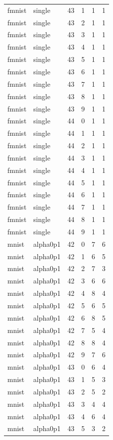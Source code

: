 \begin{tabular}{llrrrr}
fmnist & single & 43 & 1 & 1 & 1 \\
fmnist & single & 43 & 2 & 1 & 1 \\
fmnist & single & 43 & 3 & 1 & 1 \\
fmnist & single & 43 & 4 & 1 & 1 \\
fmnist & single & 43 & 5 & 1 & 1 \\
fmnist & single & 43 & 6 & 1 & 1 \\
fmnist & single & 43 & 7 & 1 & 1 \\
fmnist & single & 43 & 8 & 1 & 1 \\
fmnist & single & 43 & 9 & 1 & 1 \\
fmnist & single & 44 & 0 & 1 & 1 \\
fmnist & single & 44 & 1 & 1 & 1 \\
fmnist & single & 44 & 2 & 1 & 1 \\
fmnist & single & 44 & 3 & 1 & 1 \\
fmnist & single & 44 & 4 & 1 & 1 \\
fmnist & single & 44 & 5 & 1 & 1 \\
fmnist & single & 44 & 6 & 1 & 1 \\
fmnist & single & 44 & 7 & 1 & 1 \\
fmnist & single & 44 & 8 & 1 & 1 \\
fmnist & single & 44 & 9 & 1 & 1 \\
mnist & alpha0p1 & 42 & 0 & 7 & 6 \\
mnist & alpha0p1 & 42 & 1 & 6 & 5 \\
mnist & alpha0p1 & 42 & 2 & 7 & 3 \\
mnist & alpha0p1 & 42 & 3 & 6 & 6 \\
mnist & alpha0p1 & 42 & 4 & 8 & 4 \\
mnist & alpha0p1 & 42 & 5 & 6 & 5 \\
mnist & alpha0p1 & 42 & 6 & 8 & 5 \\
mnist & alpha0p1 & 42 & 7 & 5 & 4 \\
mnist & alpha0p1 & 42 & 8 & 8 & 4 \\
mnist & alpha0p1 & 42 & 9 & 7 & 6 \\
mnist & alpha0p1 & 43 & 0 & 6 & 4 \\
mnist & alpha0p1 & 43 & 1 & 5 & 3 \\
mnist & alpha0p1 & 43 & 2 & 5 & 2 \\
mnist & alpha0p1 & 43 & 3 & 4 & 4 \\
mnist & alpha0p1 & 43 & 4 & 6 & 4 \\
mnist & alpha0p1 & 43 & 5 & 3 & 2 \\

\end{tabular}
